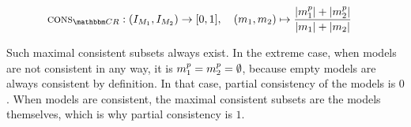 \begin{definition}
    \begin{align*}
        \function{cons}_{\consistencyrelationset{CR}}: \; 
        & (\metamodelinstanceset{M}{1}, \metamodelinstanceset{M}{2}) \rightarrow [0,1], \quad %
        (\model{m}{1}, \model{m}{2}) \mapsto \frac{\abs{\model{m}{1}^{p}} + \abs{\model{m}{2}^{p}}}{\abs{\model{m}{1}} + \abs{\model{m}{2}}}
    \end{align*}
\end{definition}

Such maximal consistent subsets always exist.
In the extreme case, when models are not consistent in any way, it is $\model{m}{1}^p = \model{m}{2}^p = \emptyset$, because empty models are always consistent by definition.
In that case, partial consistency of the models is $0$.
When models are consistent, the maximal consistent subsets are the models themselves, which is why partial consistency is $1$.




